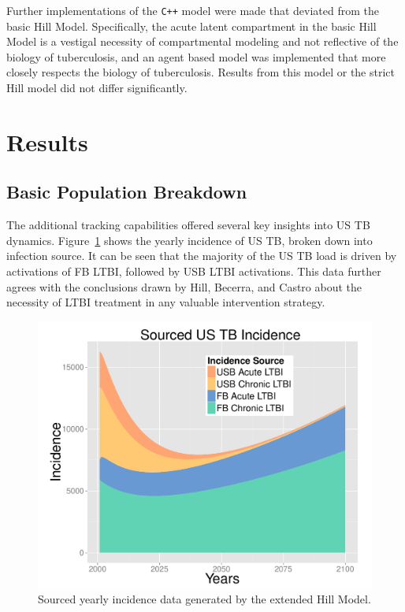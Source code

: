 \documentclass{amsart}
\begin{document}
Further implementations of the \texttt{C++} model were made that deviated from
the basic Hill Model. Specifically, the acute latent compartment in the basic
Hill Model is a vestigal necessity of compartmental modeling and not reflective
of the biology of tuberculosis, and an agent based model was implemented that
more closely respects the biology of tuberculosis. Results from this model or
the strict Hill model did not differ significantly. 

\section{Results}
\subsection{Basic Population Breakdown}
The additional tracking capabilities offered several key insights into US TB
dynamics. Figure~\ref{fig:incPlotSourced} shows the yearly incidence of US TB, broken
down into infection source. It can be seen that the majority of the US TB load
is driven by activations of FB LTBI, followed by USB LTBI activations. This data
further agrees with the conclusions drawn by Hill, Becerra, and Castro about the
necessity of LTBI treatment in any valuable intervention strategy. 
\begin{figure}[h]
  \begin{center}
    \includegraphics[scale=.5]{incPlotSourced}
  \end{center}
  \caption{Sourced yearly incidence data generated by the extended Hill Model.}
  \label{fig:incPlotSourced}
\end{figure}
\end{document}
